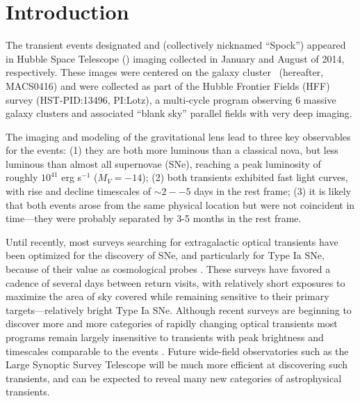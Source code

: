 \section{Introduction}\label{sec:Introduction}

The transient events designated \spockone and \spocktwo (collectively
nicknamed ``Spock'') appeared in Hubble Space Telescope (\HST) imaging
collected in January and August of 2014, respectively.  These images
were centered on the galaxy cluster \ (hereafter, MACS0416)
and were collected as part of the Hubble Frontier Fields (HFF) survey
(HST-PID:13496, PI:Lotz), a multi-cycle program observing 6 massive
galaxy clusters and associated ``blank sky'' parallel fields with very
deep imaging.

The \HST imaging and modeling of the gravitational lens lead to three
key observables for the \spock events: (1) they are both more luminous
than a classical nova, but less luminous than almost all supernovae
(SNe), reaching a peak luminosity of roughly $10^{41}$ erg s$^{−1}$
($M_V=−14$); (2) both transients exhibited fast light curves, with
rise and decline timescales of $\sim2--5$ days in the rest frame; (3)
it is likely that both events arose from the same physical location
but were not coincident in time---they were probably separated by 3-5
months in the rest frame.

Until recently, most surveys searching for extragalactic optical
transients have been optimized for the discovery of SNe, and
particularly for Type Ia SNe, because of their value as cosmological
probes \citep[e.g.,][and references therein]{Weinberg:2013}.  These
surveys have favored a cadence of several days between return visits,
with relatively short exposures to maximize the area of sky covered
while remaining sensitive to their primary targets---relatively bright
Type Ia SNe.  Although recent surveys are beginning to discover more
and more categories of rapidly changing optical transients
\citep[e.g.][]{Kasliwal:2011,Drout:2014} most programs remain largely
insensitive to transients with peak brightness and timescales
comparable to the \spock events \citep{Berger:2013}.  Future
wide-field observatories such as the Large Synoptic Survey Telescope
\citep[LSST,][]{Tyson:2002} will be much more efficient at discovering
such transients, and can be expected to reveal many new categories of
astrophysical transients.   

